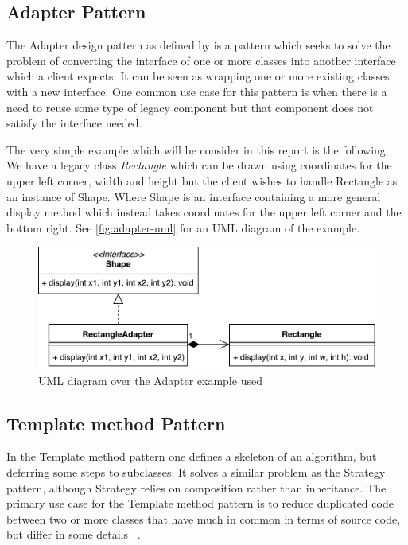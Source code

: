 \documentclass[conference]{IEEEtran}
\begin{document}
\subsection{Adapter Pattern}
\label{sub:adapter_pattern}
The Adapter design pattern as defined by \citet{gamma1993:gof} is a pattern which seeks to solve the problem of converting the interface of one or more classes into another interface which a client expects.
It can be seen as wrapping one or more existing classes with a new interface.
One common use case for this pattern is when there is a need to reuse some type of legacy component but that component does not satisfy the interface needed.

The very simple example which will be consider in this report is the following.
We have a legacy class \emph{Rectangle} which can be drawn using coordinates for the upper left corner, width and height but the client wishes to handle Rectangle as an instance of Shape.
Where Shape is an interface containing a more general display method which instead takes coordinates for the upper left corner and the bottom right.
See \autoref{fig:adapter-uml} for an UML diagram of the example.

\begin{figure}[htpb]
    \centering
    \includegraphics[width=0.8\linewidth]{adapter-ex.pdf}
    \caption{UML diagram over the Adapter example used}
    \label{fig:adapter-uml}
\end{figure}

\subsection{Template method Pattern}
\label{sub:template_method_pattern}
In the Template method pattern one defines a skeleton of an algorithm, but deferring some steps to subclasses.
It solves a similar problem as the Strategy pattern, although Strategy relies on composition rather than inheritance.
The primary use case for the Template method pattern is to reduce duplicated code between two or more classes that have much in common in terms of source code, but differ in some details ~\cite{gamma1993:gof}.
\end{document}
